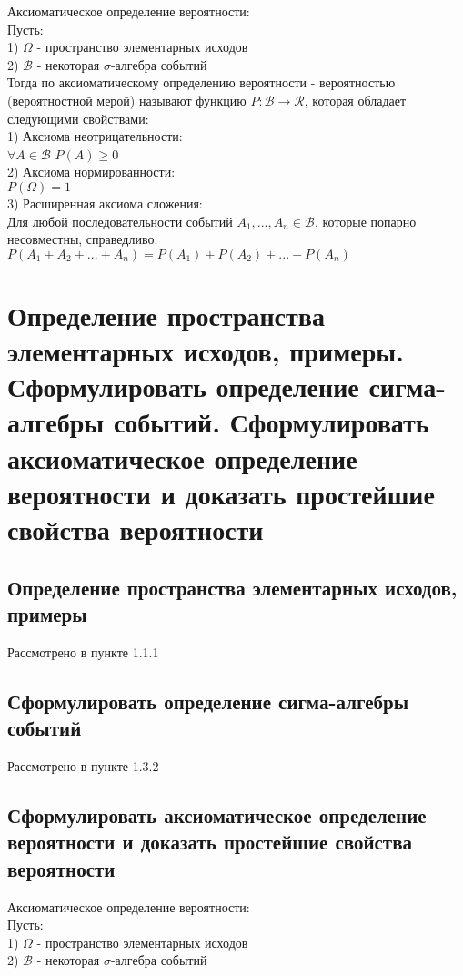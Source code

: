 Аксиоматическое определение вероятности:\\
Пусть:\\
1) $\Omega$ - пространство элементарных исходов\\
2) $\mathcal{B}$ - некоторая $\sigma$-алгебра событий\\

Тогда по аксиоматическому определению вероятности - вероятностью (вероятностной мерой) называют функцию $P : \mathcal{B} \rightarrow \mathcal{R}$, которая обладает следующими свойствами:\\
1) Аксиома неотрицательности:\\
$\forall A \in \mathcal{B}$ $P(A) \geqslant 0$\\
2) Аксиома нормированности:\\
$P(\Omega) = 1$\\
3) Расширенная аксиома сложения:\\
Для любой последовательности событий $A_{1}, ..., A_{n} \in \mathcal{B}$, которые попарно несовместны, справедливо:\\
$P(A_{1} + A_{2} + ... + A_{n}) = P(A_{1}) + P(A_{2}) + ... + P(A_{n})$

\section{Определение пространства элементарных исходов, примеры. Сформулировать определение сигма-алгебры событий. Сформулировать аксиоматическое определение вероятности и доказать простейшие свойства вероятности}

\subsection{Определение пространства элементарных исходов, примеры}
Рассмотрено в пункте 1.1.1

\subsection{Сформулировать определение сигма-алгебры событий}
Рассмотрено в пункте 1.3.2

\subsection{Сформулировать аксиоматическое определение вероятности и доказать простейшие свойства вероятности}
Аксиоматическое определение вероятности:\\
Пусть:\\
1) $\Omega$ - пространство элементарных исходов\\
2) $\mathcal{B}$ - некоторая $\sigma$-алгебра событий\\

